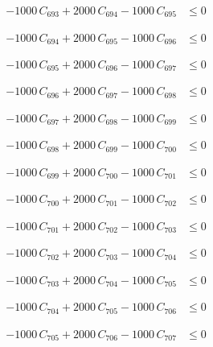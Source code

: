 \documentclass[a4paper,11pt]{article}
\begin{document}
\begin{align}
-1000\,C_{693} + 2000\,C_{694} - 1000\,C_{695} &\leq 0 \nonumber
\end{align}

\begin{align}
-1000\,C_{694} + 2000\,C_{695} - 1000\,C_{696} &\leq 0 \nonumber
\end{align}

\begin{align}
-1000\,C_{695} + 2000\,C_{696} - 1000\,C_{697} &\leq 0 \nonumber
\end{align}

\begin{align}
-1000\,C_{696} + 2000\,C_{697} - 1000\,C_{698} &\leq 0 \nonumber
\end{align}

\begin{align}
-1000\,C_{697} + 2000\,C_{698} - 1000\,C_{699} &\leq 0 \nonumber
\end{align}

\begin{align}
-1000\,C_{698} + 2000\,C_{699} - 1000\,C_{700} &\leq 0 \nonumber
\end{align}

\begin{align}
-1000\,C_{699} + 2000\,C_{700} - 1000\,C_{701} &\leq 0 \nonumber
\end{align}

\begin{align}
-1000\,C_{700} + 2000\,C_{701} - 1000\,C_{702} &\leq 0 \nonumber
\end{align}

\begin{align}
-1000\,C_{701} + 2000\,C_{702} - 1000\,C_{703} &\leq 0 \nonumber
\end{align}

\begin{align}
-1000\,C_{702} + 2000\,C_{703} - 1000\,C_{704} &\leq 0 \nonumber
\end{align}

\begin{align}
-1000\,C_{703} + 2000\,C_{704} - 1000\,C_{705} &\leq 0 \nonumber
\end{align}

\begin{align}
-1000\,C_{704} + 2000\,C_{705} - 1000\,C_{706} &\leq 0 \nonumber
\end{align}

\begin{align}
-1000\,C_{705} + 2000\,C_{706} - 1000\,C_{707} &\leq 0 \nonumber
\end{align}
\end{document}
